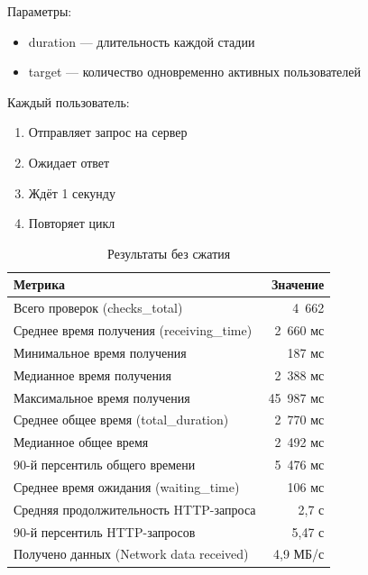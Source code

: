 \documentclass[12pt]{article}
\begin{document}
Параметры:
\begin{itemize}[label=]
    \item duration — длительность каждой стадии
    \item target — количество одновременно активных пользователей
\end{itemize}

Каждый пользователь:

\begin{enumerate}
    \item Отправляет запрос на сервер
    \item Ожидает ответ
    \item Ждёт 1 секунду
    \item Повторяет цикл
\end{enumerate}

\begin{table}[H]
    \centering
    \caption{Результаты без сжатия}
    \begin{tabular}{lr}
        \toprule
        \textbf{Метрика}                          & \textbf{Значение} \\
        \midrule
        Всего проверок (checks\_total)            & 4~662             \\
        Среднее время получения (receiving\_time) & 2~660 мс          \\
        Минимальное время получения               & 187 мс            \\
        Медианное время получения                 & 2~388 мс          \\
        Максимальное время получения              & 45~987 мс         \\
        Среднее общее время (total\_duration)     & 2~770 мс          \\
        Медианное общее время                     & 2~492 мс          \\
        90-й персентиль общего времени            & 5~476 мс          \\
        Среднее время ожидания (waiting\_time)    & 106 мс            \\
        Средняя продолжительность HTTP-запроса    & 2,7 с             \\
        90-й персентиль HTTP-запросов             & 5,47 с            \\
        Получено данных (Network data received)   & 4,9 МБ/с          \\
        \bottomrule
    \end{tabular}
\end{table}
\end{document}
